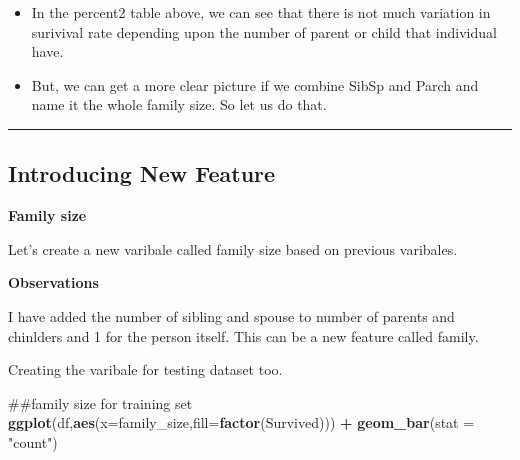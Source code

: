 \documentclass[]{article}
\newenvironment{Shaded}{\begin{snugshade}}{\end{snugshade}}
\newcommand{\KeywordTok}[1]{\textcolor[rgb]{0.13,0.29,0.53}{\textbf{#1}}}
\newcommand{\DataTypeTok}[1]{\textcolor[rgb]{0.13,0.29,0.53}{#1}}
\newcommand{\DecValTok}[1]{\textcolor[rgb]{0.00,0.00,0.81}{#1}}
\newcommand{\StringTok}[1]{\textcolor[rgb]{0.31,0.60,0.02}{#1}}
\newcommand{\OperatorTok}[1]{\textcolor[rgb]{0.81,0.36,0.00}{\textbf{#1}}}
\newcommand{\NormalTok}[1]{#1}
\providecommand{\tightlist}{%
  \setlength{\itemsep}{0pt}\setlength{\parskip}{0pt}}
\begin{document}
\begin{itemize}
\tightlist
\item
  In the percent2 table above, we can see that there is not much
  variation in surivival rate depending upon the number of parent or
  child that individual have.
\item
  But, we can get a more clear picture if we combine SibSp and Parch and
  name it the whole family size. So let us do that.
\end{itemize}

\begin{center}\rule{0.5\linewidth}{\linethickness}\end{center}

\subsection{Introducing New Feature}\label{introducing-new-feature}

\textbf{Family size}

Let's create a new varibale called family size based on previous
varibales.

\begin{Shaded}
\end{Shaded}

\textbf{Observations}

I have added the number of sibling and spouse to number of parents and
chinlders and 1 for the person itself. This can be a new feature called
family.

Creating the varibale for testing dataset too.

\begin{Shaded}
\begin{Highlighting}[]
\NormalTok{##family size for training set}
\KeywordTok{ggplot}\NormalTok{(df,}\KeywordTok{aes}\NormalTok{(}\DataTypeTok{x=}\NormalTok{family_size,}\DataTypeTok{fill=}\KeywordTok{factor}\NormalTok{(Survived))) }\OperatorTok{+}\StringTok{ }\KeywordTok{geom_bar}\NormalTok{(}\DataTypeTok{stat =} \StringTok{"count"}\NormalTok{)}
\end{Highlighting}
\end{Shaded}
\end{document}
